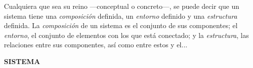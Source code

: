 {Cualquiera que sea su reino —conceptual o concreto—, se puede decir que un sistema tiene una \textit{composición} definida, un \textit{entorno} definido y una \textit{estructura} definida. La \textit{composición} de un sistema es el conjunto de sus componentes; el \textit{entorno}, el conjunto de elementos con los que está conectado; y la \textit{estructura}, las relaciones entre sus componentes, así como entre estos y el...
}

\newpage
\fancyhf{}
\fancyhead[R]{\thepage} 

\begin{center}
{\fontsize{13}{16}\selectfont \textbf{SISTEMA}}\\[0.8cm]
\end{center}

\vspace{0cm}

